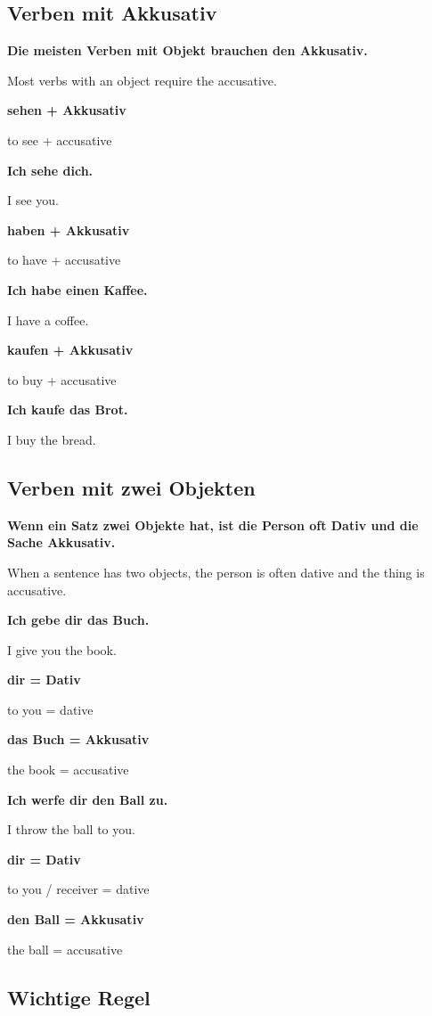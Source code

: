 \documentclass[a4paper]{article}
\newcommand{\EN}[1]{\par{\small\textcolor{TranslationGray}{#1}}\vspace{0.4em}}
\begin{document}
        \subsection{Verben mit Akkusativ}
            
            \textbf{Die meisten Verben mit Objekt brauchen den Akkusativ.}
            \EN{Most verbs with an object require the accusative.}
            
            \textbf{sehen + Akkusativ}
            \EN{to see + accusative}
            
            \textbf{Ich sehe dich.}
            \EN{I see you.}
            
            \textbf{haben + Akkusativ}
            \EN{to have + accusative}
            
            \textbf{Ich habe einen Kaffee.}
            \EN{I have a coffee.}
            
            \textbf{kaufen + Akkusativ}
            \EN{to buy + accusative}
            
            \textbf{Ich kaufe das Brot.}
            \EN{I buy the bread.}
        
        \subsection{Verben mit zwei Objekten}
            
            \textbf{Wenn ein Satz zwei Objekte hat, ist die Person oft Dativ und die Sache Akkusativ.}
            \EN{When a sentence has two objects, the person is often dative and the thing is accusative.}
            
            \textbf{Ich gebe dir das Buch.}
            \EN{I give you the book.}
            
            \textbf{dir = Dativ}
            \EN{to you = dative}
            
            \textbf{das Buch = Akkusativ}
            \EN{the book = accusative}
            
            \textbf{Ich werfe dir den Ball zu.}
            \EN{I throw the ball to you.}
            
            \textbf{dir = Dativ}
            \EN{to you / receiver = dative}
            
            \textbf{den Ball = Akkusativ}
            \EN{the ball = accusative}
        
        \subsection{Wichtige Regel}
            
\end{document}
